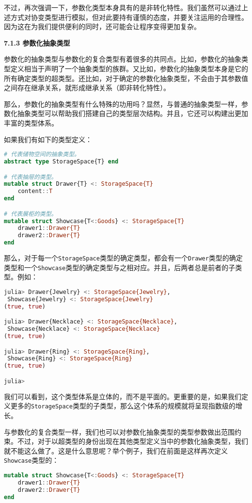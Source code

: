 不过，再次强调一下，参数化类型本身具有的是非转化特性。我们虽然可以通过上述方式对协变类型进行模拟，但对此要持有谨慎的态度，并要关注运用的合理性。因为这在为我们提供便利的同时，还可能会让程序变得更加复杂。

\textbf{7.1.3 参数化抽象类型}

参数化的抽象类型与参数化的复合类型有着很多的共同点。比如，参数化的抽象类型定义相当于声明了一个抽象类型的族群。又比如，参数化的抽象类型本身是它的所有确定类型的超类型。还比如，对于确定的参数化抽象类型，不会由于其参数值之间存在继承关系，就形成继承关系（即非转化特性）。

那么，参数化的抽象类型有什么特殊的功用吗？显然，与普通的抽象类型一样，参数化抽象类型可以帮助我们搭建自己的类型层次结构。并且，它还可以构建出更加丰富的类型体系。

如果我们有如下的类型定义：
\begin{lstlisting}[language=julia]
# 代表储物空间的抽象类型。
abstract type StorageSpace{T} end

# 代表抽屉的类型。
mutable struct Drawer{T} <: StorageSpace{T}
    content::T
end

# 代表展柜的类型。
mutable struct Showcase{T<:Goods} <: StorageSpace{T}
    drawer1::Drawer{T}
    drawer2::Drawer{T}
end
\end{lstlisting}

那么，对于每一个\verb`StorageSpace`类型的确定类型，都会有一个\verb`Drawer`类型的确定类型和一个\verb`Showcase`类型的确定类型与之相对应。并且，后两者总是前者的子类型。例如：
\begin{lstlisting}[language=julia]
julia> Drawer{Jewelry} <: StorageSpace{Jewelry},
 Showcase{Jewelry} <: StorageSpace{Jewelry}
(true, true)

julia> Drawer{Necklace} <: StorageSpace{Necklace},
 Showcase{Necklace} <: StorageSpace{Necklace}
(true, true)

julia> Drawer{Ring} <: StorageSpace{Ring},
 Showcase{Ring} <: StorageSpace{Ring}
(true, true)

julia> 
\end{lstlisting}

我们可以看到，这个类型体系是立体的，而不是平面的。更重要的是，如果我们定义更多的\verb`StorageSpace`类型的子类型，那么这个体系的规模就将呈现指数级的增长。

与参数化的复合类型一样，我们也可以对参数化抽象类型的类型参数做出范围约束。不过，对于以超类型的身份出现在其他类型定义当中的参数化抽象类型，我们就不能这么做了。这是什么意思呢？举个例子，我们在前面是这样再次定义\verb`Showcase`类型的：
\begin{lstlisting}[language=julia]
mutable struct Showcase{T<:Goods} <: StorageSpace{T}
    drawer1::Drawer{T}
    drawer2::Drawer{T}
end
\end{lstlisting}

